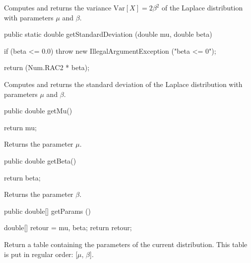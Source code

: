\begin{tabb}  Computes and returns the variance $\mbox{Var}[X] = 2 \beta^2$
   of the Laplace distribution with parameters $\mu$ and $\beta$.
\end{tabb}
\begin{htmlonly}
\end{htmlonly}
\begin{code}

   public static double getStandardDeviation (double mu, double beta)\begin{hide} {
      if (beta <= 0.0)
         throw new IllegalArgumentException ("beta <= 0");

      return (Num.RAC2 * beta);
   }\end{hide}
\end{code}
\begin{tabb}  Computes and returns the standard deviation of the Laplace
   distribution with parameters $\mu$ and $\beta$.
\end{tabb}
\begin{htmlonly}
\end{htmlonly}
\begin{code}

   public double getMu()\begin{hide} {
      return mu;
   }\end{hide}
\end{code}
\begin{tabb} Returns the parameter $\mu$.
\end{tabb}
\begin{code}

   public double getBeta()\begin{hide} {
      return beta;
   }\end{hide}
\end{code}
\begin{tabb} Returns the parameter $\beta$.
\end{tabb}
\begin{code}

   public double[] getParams ()\begin{hide} {
      double[] retour = {mu, beta};
      return retour;
   }\end{hide}
\end{code}
\begin{tabb}
   Return a table containing the parameters of the current distribution.
   This table is put in regular order: [$\mu$, $\beta$].
\end{tabb}
